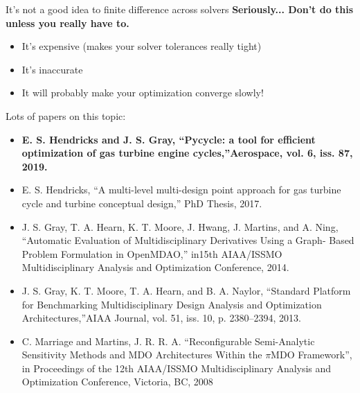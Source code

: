 \documentclass[aspectratio=169, usenames, dvipsnames, 14pt]{beamer}
\begin{document}
 \begin{frame}{It's not a good idea to finite difference across solvers}
\textbf{\small Seriously... Don’t do this unless you really have to.}

\begin{itemize}
    \item \small It’s expensive (makes your solver tolerances really tight)
    \item \small It’s inaccurate
    \item \small It will probably make your optimization converge slowly!
\end{itemize}

\small Lots of papers on this topic: 

\tiny {
\begin{itemize}
\item \textbf{E. S. Hendricks and J. S. Gray, “Pycycle: a tool for efficient optimization of gas turbine engine cycles,”Aerospace, vol. 6, iss. 87, 2019.}

\item E. S. Hendricks, “A multi-level multi-design point approach for gas turbine cycle and turbine conceptual design,” PhD Thesis, 2017.

\item J. S. Gray, T. A. Hearn, K. T. Moore, J. Hwang, J. Martins, and A. Ning, “Automatic Evaluation of Multidisciplinary Derivatives Using a Graph-			Based Problem Formulation in OpenMDAO,” in15th AIAA/ISSMO Multidisciplinary Analysis and Optimization Conference, 2014.

\item J. S. Gray, K. T. Moore, T. A. Hearn, and B. A. Naylor, “Standard Platform for Benchmarking Multidisciplinary Design Analysis and Optimization Architectures,”AIAA Journal, vol. 51, iss. 10, p. 2380–2394, 2013.

\item C. Marriage and Martins, J. R. R. A. “Reconfigurable Semi-Analytic Sensitivity Methods and MDO Architectures Within the $\pi$MDO Framework”, in Proceedings of the 12th AIAA/ISSMO Multidisciplinary Analysis and Optimization Conference, Victoria, BC, 2008
\end{itemize}
}

\end{frame}
\end{document}
